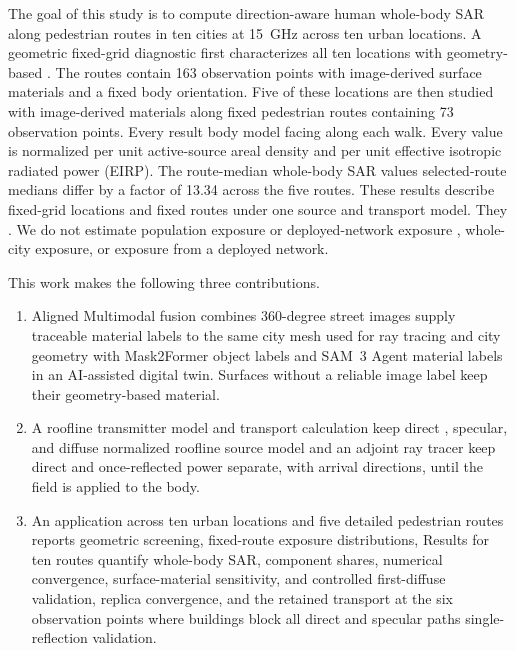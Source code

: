 \documentclass{IEEEoj} %
\providecommand{\DIFadd}[1]{{\protect\color{blue} \sf #1}} %
\providecommand{\DIFdel}[1]{{\protect\color{red} \scriptsize #1}} %
\providecommand{\DIFaddbegin}{} %
\providecommand{\DIFaddend}{} %
\providecommand{\DIFdelbegin}{} %
\providecommand{\DIFdelend}{} %
\begin{document}
\DIFadd{The goal of this study is to compute direction-aware human whole-body SAR along
pedestrian routes in ten cities }\DIFaddend at 15~GHz\DIFdelbegin \DIFdel{across ten urban locations. A geometric
fixed-grid diagnostic first characterizes all ten locations with geometry-based
}\DIFdelend \DIFaddbegin \DIFadd{. The routes contain 163 observation
points with image-derived surface }\DIFaddend materials and a \DIFdelbegin \DIFdel{fixed body orientation. Five of these locations are then studied
with image-derived materials along fixed pedestrian routes containing 73
observation points. Every result }\DIFdelend \DIFaddbegin \DIFadd{body model facing along each
walk. Every value }\DIFaddend is normalized per unit active-source areal density and per
unit effective isotropic radiated power (EIRP). The \DIFdelbegin \DIFdel{route-median
whole-body SAR values }\DIFdelend \DIFaddbegin \DIFadd{selected-route medians
}\DIFaddend differ by a factor of \DIFdelbegin \DIFdel{13.34 across the five routes. These
results describe fixed-grid locations and fixed routes under one source and
transport model. They }\DIFdelend \DIFaddbegin \DIFadd{14.31. We }\DIFaddend do not estimate population exposure\DIFdelbegin \DIFdel{or deployed-network
exposure }\DIFdelend \DIFaddbegin \DIFadd{,
whole-city exposure, or exposure from a deployed network}\DIFaddend .

This work makes the following three contributions.
\begin{enumerate}
  \item \DIFdelbegin \DIFdel{Aligned }\DIFdelend \DIFaddbegin \DIFadd{Multimodal fusion combines }\DIFaddend 360-degree street images \DIFdelbegin \DIFdel{supply traceable material labels to
  the same city mesh used for ray tracing}\DIFdelend \DIFaddbegin \DIFadd{and city geometry
  with Mask2Former object labels and SAM~3 Agent material labels in an
  AI-assisted digital twin}\DIFaddend . Surfaces without a reliable image label keep their
  geometry-based material.

  \item A \DIFdelbegin \DIFdel{roofline transmitter model and transport calculation keep
  direct ,
  specular, and diffuse }\DIFdelend \DIFaddbegin \DIFadd{normalized roofline source model and an adjoint ray tracer keep
  direct and once-reflected }\DIFaddend power separate, with arrival directions, until the
  field is applied to the body.

  \item \DIFdelbegin \DIFdel{An application across ten urban locations and five detailed pedestrian
  routes reports geometric screening, fixed-route exposure distributions, }\DIFdelend \DIFaddbegin \DIFadd{Results for ten routes quantify whole-body SAR, component shares,
  numerical convergence, surface-material sensitivity, and }\DIFaddend controlled
  \DIFdelbegin \DIFdel{first-diffuse validation,
  replica convergence, and the retained
  transport at the six observation points where buildings block all direct and
  specular paths}\DIFdelend \DIFaddbegin \DIFadd{single-reflection validation}\DIFaddend .
\end{enumerate}
\end{document}
